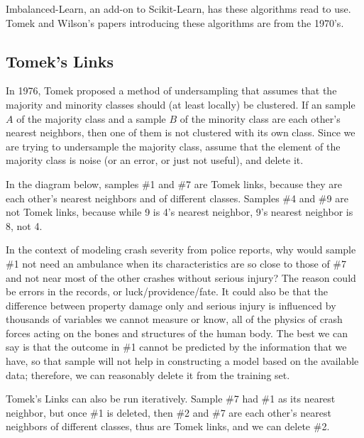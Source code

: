 Imbalanced-Learn, an add-on to Scikit-Learn, has these algorithms read to use.  Tomek and Wilson's papers introducing these algorithms are from the 1970's.  


\subsection{Tomek's Links}

In 1976, Tomek proposed a method of undersampling that assumes that the majority and minority classes should (at least locally) be clustered. \cite{ivan1976two} If an sample $A$ of the majority class and a sample $B$ of the minority class are each other's nearest neighbors, then one of them is not clustered with its own class.  Since we are trying to undersample the majority class, assume that the element of the majority class is noise (or an error, or just not useful), and delete it.  

In the diagram below, samples \#1 and \#7 are Tomek links, because they are each other's nearest neighbors and of different classes.  Samples \#4 and \#9 are not Tomek links, because while 9 is 4's nearest neighbor, 9's nearest neighbor is 8, not 4.  

In the context of modeling crash severity from police reports, why would sample \#1 not need an ambulance when its characteristics are so close to those of \#7 and not near most of the other crashes without serious injury?  The reason could be errors in the records, or luck/providence/fate.  It could also be that the difference between property damage only and serious injury is influenced by thousands of variables we cannot measure or know, all of the physics of crash forces acting on the bones and structures of the human body.  The best we can say is that the outcome in \#1 cannot be predicted by the information that we have, so that sample will not help in constructing a model based on the available data; therefore, we can reasonably delete it from the training set.  

Tomek's Links can also be run iteratively.  Sample \#7 had \#1 as its nearest neighbor, but once \#1 is deleted, then \#2 and \#7 are each other's nearest neighbors of different classes, thus are Tomek links, and we can delete \#2.  



